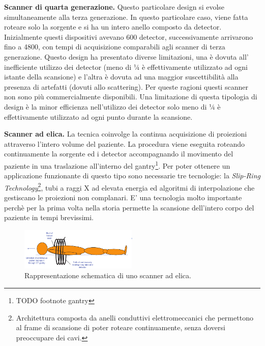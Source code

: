 \documentclass[a4paper,11pt, oneside]{article}
\begin{document}
                    \bigskip
                    \par
                        \textbf{Scanner di quarta generazione.} Questo particolare design si evolse simultaneamente alla terza generazione. In questo particolare caso, viene fatta roteare solo la sorgente e si ha un intero anello composto da detector. Inizialmente questi dispositivi avevano 600 detector, successivamente arrivarono fino a 4800, con tempi di acquisizione comparabili agli scanner di terza generazione. Questo design ha presentato diverse limitazioni, una è dovuta all’ inefficiente utilizzo dei detector (meno di ¼ è effettivamente utilizzato ad ogni istante della scansione) e l’altra è dovuta ad una maggior suscettibilità alla presenza di artefatti (dovuti allo scattering). Per queste ragioni questi scanner non sono più commercialmente disponibili. Una limitazione di questa tipologia di design è la minor efficienza nell’utilizzo dei detector solo meno di ¼ è effettivamente utilizzato ad ogni punto durante la scansione. 
                        
                    \bigskip
                    \par
                        \textbf{Scanner ad elica.} La tecnica coinvolge la continua acquisizione di proiezioni attraverso l’intero volume del paziente. La procedura viene eseguita roteando continuamente la sorgente ed i detector accompagnando il movimento del paziente in una traslazione all’interno del gantry\footnote{TODO footnote gantry}. Per poter ottenere un applicazione funzionante di questo tipo sono necessarie tre tecnologie: la \textit{Slip-Ring Technology}\footnote{Architettura composta da anelli conduttivi elettromeccanici che permettono al frame di scansione di poter roteare continuamente, senza doversi preoccupare dei cavi.}, tubi a raggi X ad elevata energia ed algoritmi di interpolazione che gestiscano le proiezioni non complanari. E’ una tecnologia molto importante perchè per la prima volta nella storia permette la scansione dell’intero corpo del paziente in tempi brevissimi.

                        \begin{figure}[h]
                            \centering
                            \includegraphics[width=0.5\textwidth]{helix}
                            \caption{Rappresentazione schematica di uno scanner ad elica.}
                            \label{fig:helix}
                        \end{figure}
\end{document}
